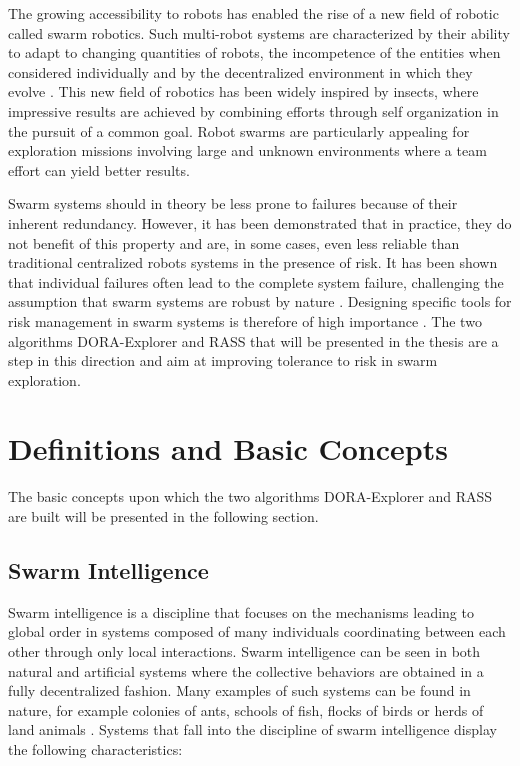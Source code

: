 
\label{sec:Introduction} 

The growing accessibility to robots has enabled the rise of a new field of robotic called swarm robotics. Such multi-robot systems are characterized by their ability to adapt to changing quantities of robots, the incompetence of the entities when considered individually and by the decentralized environment in which they evolve \cite{sahin2005swarm}. This new field of robotics has been widely inspired by insects, where impressive results are achieved by combining efforts through self organization in the pursuit of a common goal. Robot swarms are particularly appealing for exploration missions involving large and unknown environments where a team effort can yield better results.

Swarm systems should in theory be less prone to failures because of their inherent redundancy. However, it has been demonstrated that in practice, they do not benefit of this property and are, in some cases, even less reliable than traditional centralized robots systems in the presence of risk. It has been shown that individual failures often lead to the complete system failure, challenging the assumption that swarm systems are robust by nature \cite{bjerknes2013fault}. Designing specific tools for risk management in swarm systems is therefore of high importance \cite{prorok2021beyond}. The two algorithms DORA-Explorer and RASS that will be presented in the thesis are a step in this direction and aim at improving tolerance to risk in swarm exploration.

\section{Definitions and Basic Concepts}
The basic concepts upon which the two algorithms DORA-Explorer and RASS are built will be presented in the following section. 

\subsection{Swarm Intelligence}
Swarm intelligence is a discipline that focuses on the mechanisms leading to global order in systems composed of many individuals coordinating between each other through only local interactions. Swarm intelligence can be seen in both natural and artificial systems where the collective behaviors are obtained in a fully decentralized fashion. Many examples of such systems can be found in nature, for example colonies of ants, schools of fish, flocks of birds or herds of land animals \cite{Dorigo:2007}. Systems that fall into the discipline of swarm intelligence display the following characteristics: 

